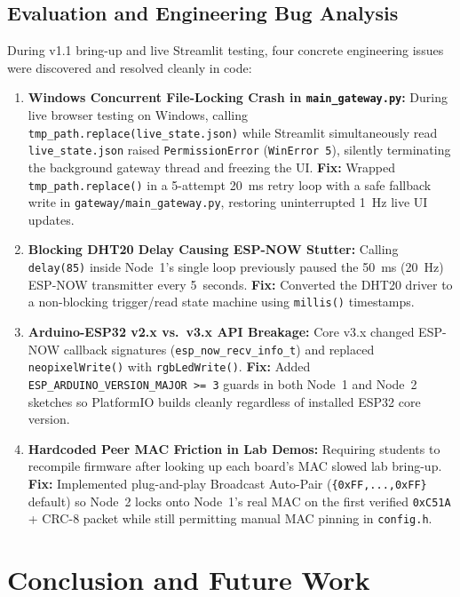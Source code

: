 \documentclass{hcmut-report}
\begin{document}
\subsection{Evaluation and Engineering Bug Analysis}
During v1.1 bring-up and live Streamlit testing, four concrete engineering issues were discovered and resolved cleanly in code:
\begin{enumerate}
  \item \textbf{Windows Concurrent File-Locking Crash in \texttt{main\_gateway.py}:} During live browser testing on Windows, calling \texttt{tmp\_path.replace(live\_state.json)} while Streamlit simultaneously read \texttt{live\_state.json} raised \texttt{PermissionError} (\texttt{WinError~5}), silently terminating the background gateway thread and freezing the UI. \textbf{Fix:} Wrapped \texttt{tmp\_path.replace()} in a 5-attempt 20~ms retry loop with a safe fallback write in \texttt{gateway/main\_gateway.py}, restoring uninterrupted 1~Hz live UI updates.
  \item \textbf{Blocking DHT20 Delay Causing ESP-NOW Stutter:} Calling \texttt{delay(85)} inside Node~1's single loop previously paused the 50~ms (20~Hz) ESP-NOW transmitter every 5~seconds. \textbf{Fix:} Converted the DHT20 driver to a non-blocking trigger/read state machine using \texttt{millis()} timestamps.
  \item \textbf{Arduino-ESP32 v2.x vs.\ v3.x API Breakage:} Core v3.x changed ESP-NOW callback signatures (\texttt{esp\_now\_recv\_info\_t}) and replaced \texttt{neopixelWrite()} with \texttt{rgbLedWrite()}. \textbf{Fix:} Added \texttt{ESP\_ARDUINO\_VERSION\_MAJOR >= 3} guards in both Node~1 and Node~2 sketches so PlatformIO builds cleanly regardless of installed ESP32 core version.
  \item \textbf{Hardcoded Peer MAC Friction in Lab Demos:} Requiring students to recompile firmware after looking up each board's MAC slowed lab bring-up. \textbf{Fix:} Implemented plug-and-play Broadcast Auto-Pair (\texttt{\{0xFF,...,0xFF\}} default) so Node~2 locks onto Node~1's real MAC on the first verified \texttt{0xC51A} + CRC-8 packet while still permitting manual MAC pinning in \texttt{config.h}.
\end{enumerate}

\section{Conclusion and Future Work}
\end{document}
